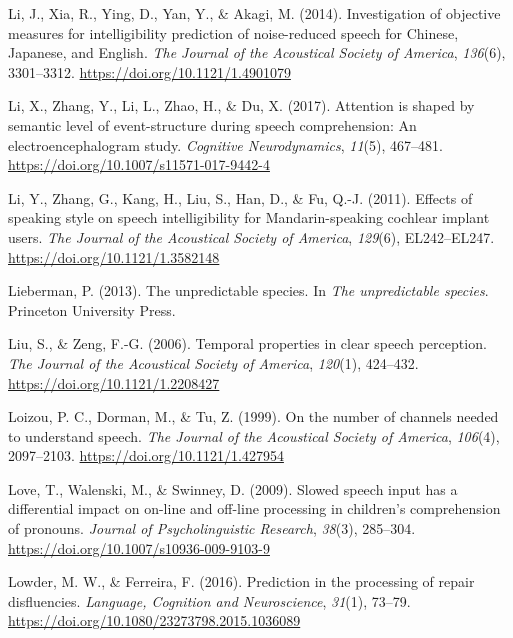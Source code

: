 \documentclass[a4paper, nobind]{templates/ociamthesis}
\newlength{\cslhangindent}
\newenvironment{CSLReferences}[2] %
 {%
  \setlength{\parindent}{0pt}
  \ifodd #1
  \let\oldpar\par
  \def\par{\hangindent=\cslhangindent\oldpar}
  \fi
  \setlength{\parskip}{1mm}
  \setlength{\baselineskip}{6mm}
 }%
 {}
\begin{document}
\begin{CSLReferences}{1}{0}
\leavevmode{}%
Li, J., Xia, R., Ying, D., Yan, Y., \& Akagi, M. (2014). {Investigation of objective measures for intelligibility prediction of noise-reduced speech for Chinese, Japanese, and English}. \emph{The Journal of the Acoustical Society of America}, \emph{136}(6), 3301--3312. \url{https://doi.org/10.1121/1.4901079}

\leavevmode{}%
Li, X., Zhang, Y., Li, L., Zhao, H., \& Du, X. (2017). {Attention is shaped by semantic level of event-structure during speech comprehension: An electroencephalogram study}. \emph{Cognitive Neurodynamics}, \emph{11}(5), 467--481. \url{https://doi.org/10.1007/s11571-017-9442-4}

\leavevmode{}%
Li, Y., Zhang, G., Kang, H., Liu, S., Han, D., \& Fu, Q.-J. (2011). {Effects of speaking style on speech intelligibility for Mandarin-speaking cochlear implant users}. \emph{The Journal of the Acoustical Society of America}, \emph{129}(6), EL242--EL247. \url{https://doi.org/10.1121/1.3582148}

\leavevmode{}%
Lieberman, P. (2013). The unpredictable species. In \emph{The unpredictable species}. Princeton University Press.

\leavevmode{}%
Liu, S., \& Zeng, F.-G. (2006). {Temporal properties in clear speech perception}. \emph{The Journal of the Acoustical Society of America}, \emph{120}(1), 424--432. \url{https://doi.org/10.1121/1.2208427}

\leavevmode{}%
Loizou, P. C., Dorman, M., \& Tu, Z. (1999). On the number of channels needed to understand speech. \emph{The Journal of the Acoustical Society of America}, \emph{106}(4), 2097--2103. \url{https://doi.org/10.1121/1.427954}

\leavevmode{}%
Love, T., Walenski, M., \& Swinney, D. (2009). {Slowed speech input has a differential impact on on-line and off-line processing in children's comprehension of pronouns}. \emph{Journal of Psycholinguistic Research}, \emph{38}(3), 285--304. \url{https://doi.org/10.1007/s10936-009-9103-9}

\leavevmode{}%
Lowder, M. W., \& Ferreira, F. (2016). {Prediction in the processing of repair disfluencies}. \emph{Language, Cognition and Neuroscience}, \emph{31}(1), 73--79. \url{https://doi.org/10.1080/23273798.2015.1036089}


\end{CSLReferences}
\end{document}
